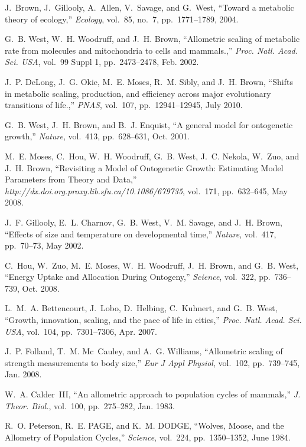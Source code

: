 \documentclass[11pt]{article}
\begin{document}
\begin{multicols}{2}
{\begin{thebibliography}{10}
J.~Brown, J.~Gillooly, A.~Allen, V.~Savage, and G.~West, ``{Toward a metabolic
  theory of ecology},'' {\em Ecology}, vol.~85, no.~7, pp.~1771--1789, 2004.

G.~B. West, W.~H. Woodruff, and J.~H. Brown, ``{Allometric scaling of metabolic
  rate from molecules and mitochondria to cells and mammals.},'' {\em Proc.
  Natl. Acad. Sci. USA}, vol.~99 Suppl 1, pp.~2473--2478, Feb. 2002.

J.~P. DeLong, J.~G. Okie, M.~E. Moses, R.~M. Sibly, and J.~H. Brown, ``{Shifts
  in metabolic scaling, production, and efficiency across major evolutionary
  transitions of life.},'' {\em PNAS}, vol.~107, pp.~12941--12945, July 2010.

G.~B. West, J.~H. Brown, and B.~J. Enquist, ``{A general model for ontogenetic
  growth},'' {\em Nature}, vol.~413, pp.~628--631, Oct. 2001.

M.~E. Moses, C.~Hou, W.~H. Woodruff, G.~B. West, J.~C. Nekola, W.~Zuo, and
  J.~H. Brown, ``{Revisiting a Model of Ontogenetic Growth: Estimating Model
  Parameters from Theory and Data},'' {\em
  http://dx.doi.org.proxy.lib.sfu.ca/10.1086/679735}, vol.~171, pp.~632--645,
  May 2008.

J.~F. Gillooly, E.~L. Charnov, G.~B. West, V.~M. Savage, and J.~H. Brown,
  ``{Effects of size and temperature on developmental time},'' {\em Nature},
  vol.~417, pp.~70--73, May 2002.

C.~Hou, W.~Zuo, M.~E. Moses, W.~H. Woodruff, J.~H. Brown, and G.~B. West,
  ``{Energy Uptake and Allocation During Ontogeny},'' {\em Science}, vol.~322,
  pp.~736--739, Oct. 2008.

L.~M.~A. Bettencourt, J.~Lobo, D.~Helbing, C.~Kuhnert, and G.~B. West,
  ``{Growth, innovation, scaling, and the pace of life in cities},'' {\em Proc.
  Natl. Acad. Sci. USA}, vol.~104, pp.~7301--7306, Apr. 2007.

J.~P. Folland, T.~M. Mc~Cauley, and A.~G. Williams, ``{Allometric scaling of
  strength measurements to body size},'' {\em Eur J Appl Physiol}, vol.~102,
  pp.~739--745, Jan. 2008.

W.~A. Calder~III, ``{An allometric approach to population cycles of mammals},''
  {\em J. Theor. Biol.}, vol.~100, pp.~275--282, Jan. 1983.

R.~O. Peterson, R.~E. PAGE, and K.~M. DODGE, ``{Wolves, Moose, and the
  Allometry of Population Cycles},'' {\em Science}, vol.~224, pp.~1350--1352,
  June 1984.


\end{thebibliography}}
\end{multicols}
\end{document}
